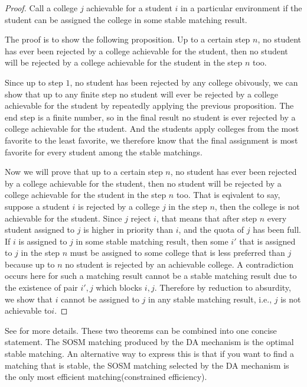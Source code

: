\begin{proof}
Call a college $j$ achievable for a student $i$ in a particular
environment if the student can be assigned the college in some stable
matching result. 

The proof is to show the following proposition. Up to a certain step $ n $, no student has ever
been rejected by a college achievable for the student, then no student
will be rejected by a college achievable for the student in the step
$n$ too. 

Since up to step $1$, no student has been rejected by any
college obivously, we can show that up to  any finite step no student
will ever be rejected by  a college achievable for the student by
repeatedly applying the previous proposition.  The
end step is a finite number, so in the final result no student is ever
rejected by a college achievable for the student. And the students apply colleges from the most favorite to the least favorite, we therefore know that the final assignment is most favorite for every
student among the stable matchings.

Now we will prove that up to a certain step $ n $, no student has ever
been rejected by a college achievable for the student, then no student
will be rejected by a college achievable for the student in the step
$n$ too.  
That is
eqivalent to
say, suppose a
student $i$ is rejected by a college  $j$ in the
step $n$, then the college is not achievable for the student. Since
$j$ reject $i$, that means that  after
step $n$ every student assigned to $j$ is higher in priority than $i$,
and the quota of $j$ has been full. If $i$ is assigned to $j$ in some
stable 
matching result, then some $i'$ that is assigned to $j$ in the step
$n$ must be assigned to some college that is less preferred than $j$
because up to $n$ no student is rejected by an achievable college. A
contradiction occurs here for such a matching result cannot be
a stable matching result due to the existence of pair $i', j $ which
blocks $i, j$. Therefore by reduction to absurdity,  we show that $i$
cannot be assigned to $j$  in any stable matching result, i.e., $j$ is
not achievable to$i$.
\end{proof}

See \parencite{Gale1962} for more details.
These two theorems can be combined into one concise statement. The SOSM
matching produced by the DA mechanism is the optimal stable matching.
An alternative way to express this is that if you want to find a
matching that is stable, the SOSM matching selected by the DA  mechanism is the only most
efficient matching(constrained efficiency).

